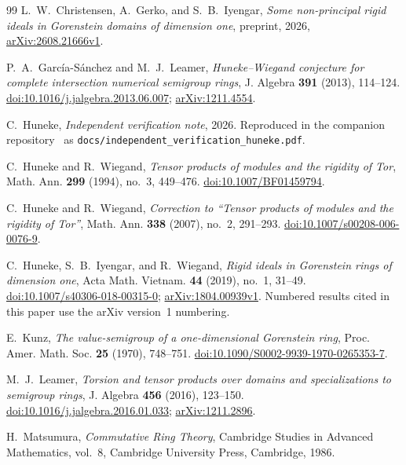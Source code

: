 \documentclass[11pt,letterpaper]{article}
\theoremstyle{remark}
\numberwithin{equation}{section}
\begin{document}
\begingroup
\small
\begin{thebibliography}{99}
\setlength{\itemsep}{3pt}
L.~W.~Christensen, A.~Gerko, and S.~B.~Iyengar,
\emph{Some non-principal rigid ideals in Gorenstein domains of dimension one},
preprint, 2026, \href{https://arxiv.org/abs/2608.21666v1}{arXiv:2608.21666v1}.

P.~A.~Garc\'ia-S\'anchez and M.~J.~Leamer,
\emph{Huneke--Wiegand conjecture for complete intersection numerical semigroup rings},
J. Algebra \textbf{391} (2013), 114--124.
\href{https://doi.org/10.1016/j.jalgebra.2013.06.007}{doi:10.1016/j.jalgebra.2013.06.007};
\href{https://arxiv.org/abs/1211.4554}{arXiv:1211.4554}.

C.~Huneke, \emph{Independent verification note}, 2026.
Reproduced in the companion repository~\cite{PhamRepo} as \nolinkurl{docs/independent_verification_huneke.pdf}.

C.~Huneke and R.~Wiegand,
\emph{Tensor products of modules and the rigidity of Tor},
Math. Ann. \textbf{299} (1994), no.~3, 449--476.
\href{https://doi.org/10.1007/BF01459794}{doi:10.1007/BF01459794}.

C.~Huneke and R.~Wiegand,
\emph{Correction to ``Tensor products of modules and the rigidity of Tor''},
Math. Ann. \textbf{338} (2007), no.~2, 291--293.
\href{https://doi.org/10.1007/s00208-006-0076-9}{doi:10.1007/s00208-006-0076-9}.

C.~Huneke, S.~B.~Iyengar, and R.~Wiegand,
\emph{Rigid ideals in Gorenstein rings of dimension one},
Acta Math. Vietnam. \textbf{44} (2019), no.~1, 31--49.
\href{https://doi.org/10.1007/s40306-018-00315-0}{doi:10.1007/s40306-018-00315-0};
\href{https://arxiv.org/abs/1804.00939v1}{arXiv:1804.00939v1}.
Numbered results cited in this paper use the arXiv version~1 numbering.

E.~Kunz,
\emph{The value-semigroup of a one-dimensional Gorenstein ring},
Proc. Amer. Math. Soc. \textbf{25} (1970), 748--751.
\href{https://doi.org/10.1090/S0002-9939-1970-0265353-7}{doi:10.1090/S0002-9939-1970-0265353-7}.

M.~J.~Leamer,
\emph{Torsion and tensor products over domains and specializations to semigroup rings},
J. Algebra \textbf{456} (2016), 123--150.
\href{https://doi.org/10.1016/j.jalgebra.2016.01.033}{doi:10.1016/j.jalgebra.2016.01.033};
\href{https://arxiv.org/abs/1211.2896}{arXiv:1211.2896}.

H.~Matsumura, \emph{Commutative Ring Theory},
Cambridge Studies in Advanced Mathematics, vol.~8,
Cambridge University Press, Cambridge, 1986.


\end{thebibliography}
\end{document}
